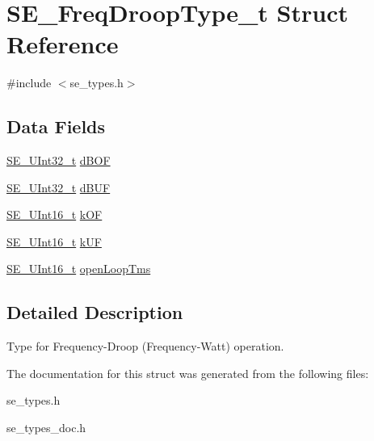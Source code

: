 \hypertarget{structSE__FreqDroopType__t}{}\section{S\+E\+\_\+\+Freq\+Droop\+Type\+\_\+t Struct Reference}
\label{structSE__FreqDroopType__t}


{\ttfamily \#include $<$se\+\_\+types.\+h$>$}

\subsection*{Data Fields}
\begin{DoxyCompactItemize}
\item 
\hyperlink{group__UInt32_ga70bd4ecda3c0c85d20779d685a270cdb}{S\+E\+\_\+\+U\+Int32\+\_\+t} \hyperlink{group__FreqDroopType_gac94af74f0f95cfdfd309edf0b1332b60}{d\+B\+OF}
\item 
\hyperlink{group__UInt32_ga70bd4ecda3c0c85d20779d685a270cdb}{S\+E\+\_\+\+U\+Int32\+\_\+t} \hyperlink{group__FreqDroopType_ga4b8bb547bb1d3615836aa7fda01d55fe}{d\+B\+UF}
\item 
\hyperlink{group__UInt16_gac68d541f189538bfd30cfaa712d20d29}{S\+E\+\_\+\+U\+Int16\+\_\+t} \hyperlink{group__FreqDroopType_ga34e6fdc066c8a02a83fd66e680b53645}{k\+OF}
\item 
\hyperlink{group__UInt16_gac68d541f189538bfd30cfaa712d20d29}{S\+E\+\_\+\+U\+Int16\+\_\+t} \hyperlink{group__FreqDroopType_gaa2d7a3faec478c0774843e3082b281c4}{k\+UF}
\item 
\hyperlink{group__UInt16_gac68d541f189538bfd30cfaa712d20d29}{S\+E\+\_\+\+U\+Int16\+\_\+t} \hyperlink{group__FreqDroopType_gafca704755da556995f473d9fd5d40383}{open\+Loop\+Tms}
\end{DoxyCompactItemize}


\subsection{Detailed Description}
Type for Frequency-\/\+Droop (Frequency-\/\+Watt) operation. 

The documentation for this struct was generated from the following files\+:\begin{DoxyCompactItemize}
\item 
se\+\_\+types.\+h\item 
se\+\_\+types\+\_\+doc.\+h\end{DoxyCompactItemize}
